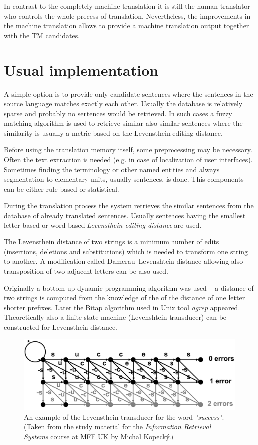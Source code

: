 In contrast to the completely machine translation it is still the human translator who controls the whole process of translation. Nevertheless, the improvements in the machine translation allows to provide a machine translation output together with the TM candidates.

\section{Usual implementation}

A simple option is to provide only candidate sentences where the sentences in the source language matches exactly each other. Usually the database is relatively sparse and probably no sentences would be retrieved. In such cases a fuzzy matching algorithm is used to retrieve similar also similar sentences where the similarity is usually a metric based on the Levensthein editing distance.

Before using the translation memory itself, some preprocessing may be necessary. Often the text extraction is needed (e.g. in case of localization of user interfaces). Sometimes finding the terminology or other named entities and always segmentation to elementary units, usually sentences, is done. This components can be either rule based or statistical. 

During the translation process the system retrieves the similar sentences from the database of already translated sentences. Usually sentences having the smallest letter based or word based \emph{Levensthein editing distance} are used.

The Levensthein distance of two strings is a minimum number of edits (insertions, deletions and substitutions) which is needed to transform one string to another. A modification called Damerau–Levenshtein distance allowing also transposition of two adjacent letters can be also used.

Originally a bottom-up dynamic programming algorithm was used -- a distance of two strings is computed from the knowledge of the of the distance of one letter shorter prefixes. Later the Bitap algorithm used in Unix tool \emph{agrep} appeared. Theoretically also a finite state machine (Levenshtein transducer) can be constructed for Levensthein distance.

\begin{figure}
\begin{center}
\includegraphics[scale=0.65]{./figures/levensthein.pdf}
\end{center}

\caption{An example of the Levensthein transducer for the word \emph{"success"}. (Taken from the study material for the \emph{Information Retrieval Systems} course at MFF UK by Michal Kopecký.)}
\end{figure}


